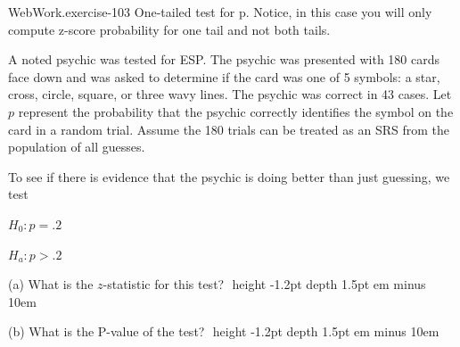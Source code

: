 \documentclass[10pt,]{book}
\newcommand{\fillin}[1]{\leavevmode\leaders\vrule height -1.2pt depth 1.5pt \hskip #1em minus #1em \null}
\numberwithin{equation}{section}
\begin{document}
%
\par
\hypertarget{p-1464}{}%
\begin{inlineexercise}{WebWork.}{exercise-103}%
\hypertarget{p-1465}{}%
One-tailed test for p. Notice, in this case you will only compute z-score probability for one tail and not both tails.%
\par\medskip
\hypertarget{p-1466}{}%
A noted psychic was tested for ESP.  The psychic was presented with 180 cards face down and was asked to determine if the card was one of 5 symbols: a star, cross, circle, square, or three wavy lines.  The psychic was correct in 43 cases.  Let \(p\) represent the probability that the psychic correctly identifies the symbol on the card in a random trial. Assume the 180 trials can be treated as an SRS from the population of all guesses.%
\par
\hypertarget{p-1467}{}%
To see if there is evidence that the psychic is doing better than just guessing, we test%
\par
\hypertarget{p-1468}{}%
\(H_0: p = .2\)%
\par
\hypertarget{p-1469}{}%
\(H_a: p > .2\)%
\par
\hypertarget{p-1470}{}%
(a) What is the \(z\)-statistic for this test? \(\)  \fillin{10}%
\par
\hypertarget{p-1471}{}%
(b) What is the P-value of the test?  \(\)  \fillin{10}%
\end{inlineexercise}
%
%
%
\typeout{************************************************}
\typeout{************************************************}
%
\end{document}
